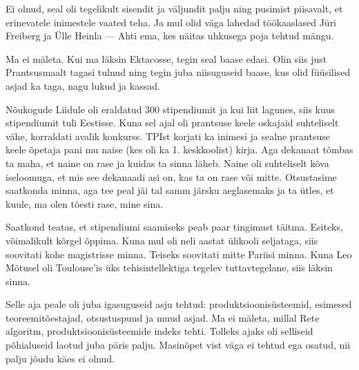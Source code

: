 Ei olnud, seal oli tegelikult sisendit ja väljundit palju ning pusimist piisavalt, et erinevatele 
inimestele vaated teha. Ja mul olid väga lahedad 
töökaaslased Jüri Freiberg ja Ülle 
Heinla --- Ahti ema, kes näitas uhkusega poja
tehtud mängu. 


Ma ei mäleta. Kui ma läksin Ektacosse, tegin seal 
baase edasi. Olin siis just Prantsusmaalt tagasi tulnud ning tegin juba 
niisuguseid baase, kus olid füüsilised asjad ka taga, nagu lukud ja kassad.


Nõukogude Liidule oli eraldatud 300 stipendiumit ja kui liit 
lagunes, 
siis kuus stipendiumit tuli Eestisse. Kuna sel ajal oli prantsuse keele 
oskajaid suhteliselt vähe, korraldati 
avalik konkurss. TPIst korjati ka inimesi ja sealne prantsuse keele õpetaja 
pani mu naise (kes oli ka 1. keskkoolist) kirja. Aga dekanaat tõmbas ta 
maha, et naine on rase ja kuidas ta sinna läheb. Naine oli suhteliselt kõva 
iseloomuga, et mis see dekanaadi asi on, kas ta on rase või mitte. Otsustasime
saatkonda minna, aga tee peal jäi tal samm järsku 
aeglasemaks ja ta ütles, et kuule, ma olen tõesti rase, mine sina.

Saatkond teatas, et stipendiumi saamiseks 
peab paar tingimust täitma. Esiteks, võimalikult kõrgel õppima. Kuna mul oli 
neli aastat ülikooli seljataga, siis soovitati kohe magistrisse minna. Teiseks soovitati mitte 
Pariisi minna. Kuna Leo Mõtusel oli Toulouse'is 
üks tehisintellektiga tegelev tuttavtegelane, siis läksin 
sinna.


Selle aja peale oli juba igasuguseid asju tehtud: 
produktsioonisüsteemid, esimesed teoreemitõestajad, otsustuspuud ja muud asjad. Ma ei mäleta, millal 
Rete algoritm,
produktsioonisüsteemide indeks tehti. Tolleks ajaks oli 
selliseid põhialuseid laotud juba päris palju. Masinõpet vist väga 
ei tehtud ega osatud, nii palju jõudu käes ei olnud.

